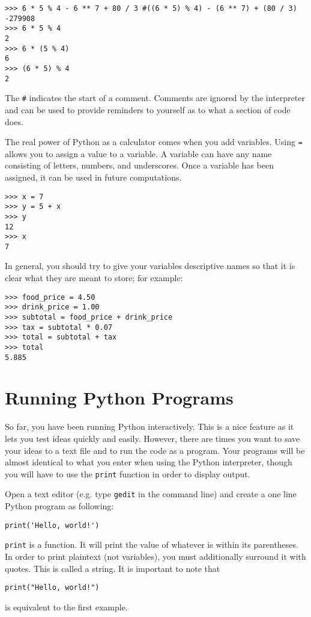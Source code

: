 \documentclass[11pt]{cselabheader}
\begin{document}
\begin{lstlisting}[style=bash]
>>> 6 * 5 % 4 - 6 ** 7 + 80 / 3 #((6 * 5) % 4) - (6 ** 7) + (80 / 3)
-279908
>>> 6 * 5 % 4
2
>>> 6 * (5 % 4)
6
>>> (6 * 5) % 4
2
\end{lstlisting}

The \texttt{\#} indicates the start of a comment. Comments are ignored by the
interpreter and can be used to provide reminders to yourself as to what a
section of code does.

The real power of Python as a calculator comes when you add variables. Using
\texttt{=} allows you to assign a value to a variable. A variable can have any
name consisting of letters, numbers, and underscores. Once a variable has been
assigned, it can be used in future computations.

\begin{lstlisting}[style=bash]
>>> x = 7
>>> y = 5 + x
>>> y
12
>>> x
7
\end{lstlisting}

In general, you should try to give your variables descriptive names so that it is
clear what they are meant to store; for example:

\begin{lstlisting}[style=bash]
>>> food_price = 4.50
>>> drink_price = 1.00
>>> subtotal = food_price + drink_price
>>> tax = subtotal * 0.07
>>> total = subtotal + tax
>>> total
5.885
\end{lstlisting}

\pagebreak
\section{Running Python Programs}

So far, you have been running Python interactively. This is a nice feature as it
lets you test ideas quickly and easily. However, there are times you want to
save your ideas to a text file and to run the code as a program. Your programs
will be almost identical to what you enter when using the Python interpreter,
though you will have to use the \texttt{print} function in order to display
output.

Open a text editor (e.g. type \texttt{gedit} in the command line) and create a
one line Python program as following:
\begin{lstlisting}[style=python]
print('Hello, world!')
\end{lstlisting}

\texttt{print} is a function. It will print the value of whatever is within its
parentheses. In order to print plaintext (not variables), you must additionally
surround it with quotes. This is called a string. It is important to note that
\begin{lstlisting}[style=python]
print("Hello, world!")
\end{lstlisting}
is equivalent to the first example.
\end{document}

